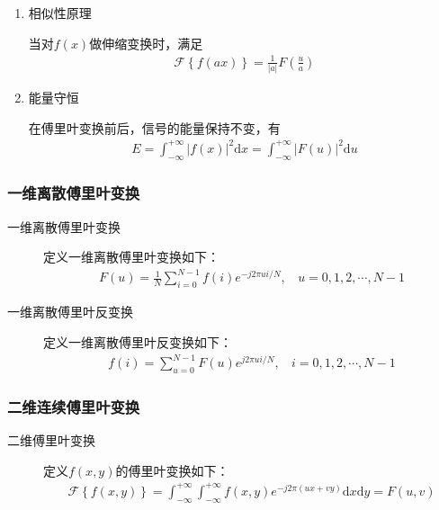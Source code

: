 \documentclass{hitreport}
\begin{document}
\begin{enumerate}
\item 相似性原理

当对$f\left(x\right)$做伸缩变换时，满足
\begin{align}
\mathscr{F} \left\{f\left(ax\right)\right\} = \frac{1}{\lvert a \rvert}F\left(\frac{u}{a}\right)
\end{align}

\item 能量守恒

在傅里叶变换前后，信号的能量保持不变，有
\begin{align}
E=\int_{-\infty}^{+\infty}{\lvert f\left(x\right) \rvert^{2}\mathrm{d}x} = \int_{-\infty}^{+\infty}{\lvert F\left(u\right) \rvert^{2}\mathrm{d}u}
\end{align}
\end{enumerate}

\subsubsection{一维离散傅里叶变换}

\begin{description}
\item[一维离散傅里叶变换] 

定义一维离散傅里叶变换如下：
\begin{align}
F\left(u\right) = \frac{1}{N}\sum_{i=0}^{N-1}{f\left(i\right)e^{\left. -j2\pi ui / N \right.}},\ \ \ \ u=0,1,2,\cdots,N-1
\end{align}
\end{description}
\begin{description}
\item[一维离散傅里叶反变换] 

定义一维离散傅里叶反变换如下：
\begin{align}
f\left(i\right) = \sum_{u=0}^{N-1}{F\left(u\right)e^{\left. j2\pi ui / N \right.}},\ \ \ \ i=0,1,2,\cdots,N-1
\end{align}
\end{description}



\subsubsection{二维连续傅里叶变换}

\begin{description}
\item[二维傅里叶变换] 
定义$f\left(x,y\right)$的傅里叶变换如下：
\begin{align}
\mathscr{F} \left\{f\left(x,y\right)\right\} = \int_{-\infty}^{+\infty}\int_{-\infty}^{+\infty}{f\left(x,y\right)e^{-j2\pi \left(ux+vy\right)} \mathrm{d}x\mathrm{d}y} = F\left(u,v\right)
\end{align}
\end{description}
\end{document}
